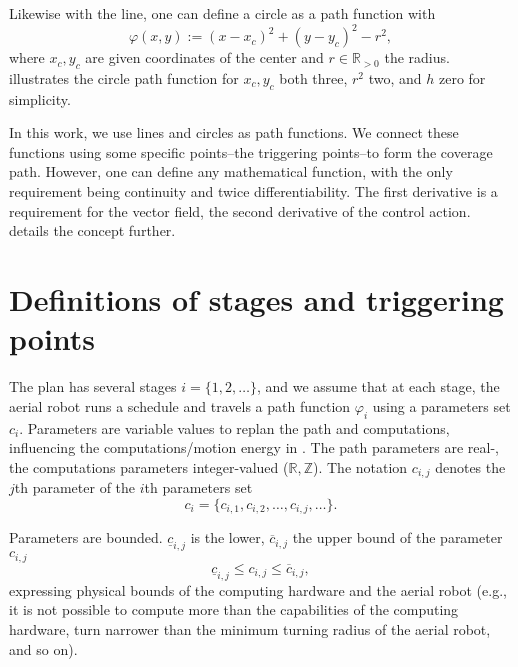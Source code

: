 Likewise with the line, one can define a circle as a path function with
\begin{equation}\label{eq:pathf-circle}
  \varphi(x,y):=(x-x_c)^2+(y-y_c)^2-r^2,
\end{equation}
where $x_c,y_c$ are given coordinates of the center and $r\in\mathbb{R}_{>0}$ the radius.  illustrates the circle path function for $x_c,y_c$ both three, $r^2$ two, and $h$ zero for simplicity. 

In this work, we use lines and circles as path functions. We connect these functions using some specific points--the triggering points--to form the coverage path. However, one can define any mathematical function, with the only requirement being continuity and twice differentiability. The first derivative is a requirement for the vector field, the second derivative of the control action.  details the concept further.


\section{Definitions of stages and triggering points}
\label{sec:defs-stages-triggs}

The plan has several stages $i=\{1,2,\dots\}$, and we assume that at each stage, the aerial robot runs a schedule and travels a path function $\varphi_i$ using a parameters set $c_i$.
Parameters are variable values to replan the path and computations, influencing the computations/motion energy in . The path parameters are real-, the computations parameters integer-valued ($\mathbb{R},\mathbb{Z}$). The notation $c_{i,j}$ denotes the $j$th parameter of the $i$th parameters set
\begin{equation}
  c_i=\{c_{i,1},c_{i,2},\dots,c_{i,j},\dots\}.
\end{equation}

Parameters are bounded. $\underline{c}_{i,j}$ is the lower, $\overline{c}_{i,j}$ the upper bound of the parameter $c_{i,j}$
\begin{equation}
  \underline{c}_{i,j}\leq c_{i,j}\leq\overline{c}_{i,j},
\end{equation}
expressing physical bounds of the computing hardware and the aerial robot (e.g., it is not possible to compute more than the capabilities of the computing hardware, turn narrower than the minimum turning radius of the aerial robot, and so on).

